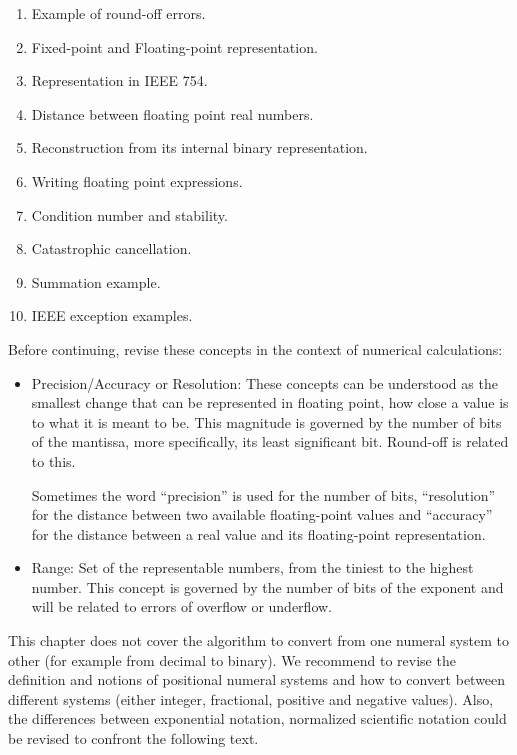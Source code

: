 \begin{enumerate} 
    \setlength\itemsep{-0.1cm}
    \item Example of round-off errors. 
    \item Fixed-point and Floating-point representation.
    \item Representation in IEEE 754.
    \item Distance between floating point real numbers.
    \item Reconstruction from its internal binary representation.
    \item Writing floating point expressions.
    \item Condition number and stability.
    \item Catastrophic cancellation.
    \item Summation example.
    \item IEEE exception examples.
\end{enumerate} 

Before continuing, revise these concepts in the context of numerical calculations:

\begin{itemize}
    \item Precision/Accuracy or Resolution: These concepts can be understood as the smallest change that can be represented in floating point, 
    how close a value is to what it is meant to be. This magnitude is governed by the number of bits of the mantissa, more specifically, its least significant bit. 
    Round-off is related to this. 
    
    Sometimes the word ``precision'' is used for the number of bits, 
    ``resolution'' for the distance between two available floating-point values and 
    ``accuracy'' for the distance between a real value and its floating-point representation. 

    \item Range: Set of the representable numbers, from the tiniest to the highest number. This concept is governed by the number of 
    bits of the exponent and will be related to errors of overflow or underflow. 
\end{itemize}

This chapter does not cover the algorithm to convert from one numeral system to other (for example from decimal to binary). We recommend to revise the definition and notions of positional numeral systems and how to convert between different systems (either integer, fractional, positive and negative values).
Also, the differences between exponential notation, normalized scientific notation could be revised to confront the following text. 


